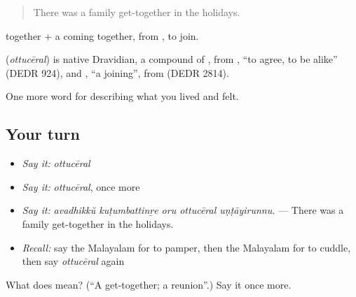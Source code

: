 \begin{quote}
There was a family get-together in the holidays.
\end{quote}

 together +  a coming together, from , to join.

\begin{cousinweb}
\textbf{} (\emph{ottucēral}) is native Dravidian, a compound of , from , \textquotedblleft{}to agree, to be alike\textquotedblright{} (DEDR 924), and , \textquotedblleft{}a joining\textquotedblright{}, from  (DEDR 2814).
\end{cousinweb}

\begin{grammarlens}[title={What you've built}]
One more word for describing what you lived and felt.
\end{grammarlens}

\subsection*{Your turn}
\begin{itemize}
\raggedright
  \item \emph{Say it:} \emph{ottucēral}
  \item \emph{Say it:} \emph{ottucēral}, once more
  \item \emph{Say it:} \emph{avadhikkŭ kuṭumbattinṟe oru ottucēral uṇṭāyirunnu.} — There was a family get-together in the holidays.
  \item \emph{Recall:} say the Malayalam for to pamper, then the Malayalam for to cuddle, then say \emph{ottucēral} again
\end{itemize}

\begin{tcolorbox}[breakable,colback=teal!4,colframe=teal!35!black,title={Before you move on}]
What does  mean? (\textquotedblleft{}A get-together; a reunion\textquotedblright{}.) Say it once more.
\end{tcolorbox}
